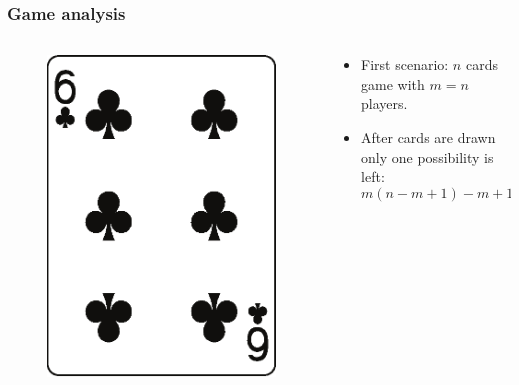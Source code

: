 \documentclass[10pt]{beamer}
\begin{document}
\begin{frame}
\frametitle{Game analysis}
 \begin{columns}
  \begin{column}{3cm}
   \begin{figure}
    \includegraphics[width=\linewidth]{im/clubs_6.eps}
   \end{figure}
  \end{column}
  
  \begin{column}{7cm}
    \begin{itemize}[label=$\clubsuit$]
      \item First scenario: $n$ cards game with $m=n$ players.
      \item After cards are drawn only one possibility is left: 
      \begin{equation*}
	m(n-m+1) -m + 1 = 1
      \end{equation*}
    \end{itemize}
  \end{column}
 \end{columns}
\end{frame}
\end{document}
